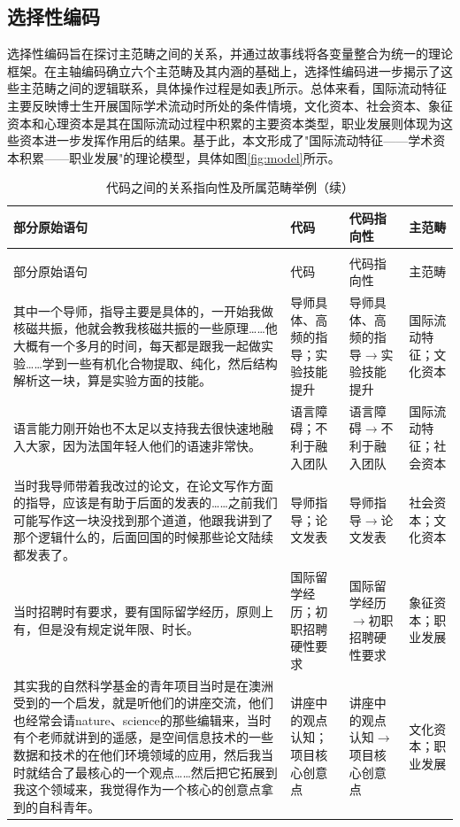 \subsection{选择性编码}

选择性编码旨在探讨主范畴之间的关系，并通过故事线将各变量整合为统一的理论框架。在主轴编码确立六个主范畴及其内涵的基础上，选择性编码进一步揭示了这些主范畴之间的逻辑联系，具体操作过程是如表\ref{tab:selective-coding}所示。总体来看，国际流动特征主要反映博士生开展国际学术流动时所处的条件情境，文化资本、社会资本、象征资本和心理资本是其在国际流动过程中积累的主要资本类型，职业发展则体现为这些资本进一步发挥作用后的结果。基于此，本文形成了"国际流动特征——学术资本积累——职业发展"的理论模型，具体如图\ref{fig:model}所示。

{\small
\begin{longtable}{p{5.5cm}p{3cm}p{3.5cm}p{2cm}}
\caption{代码之间的关系指向性及所属范畴举例} \label{tab:selective-coding} \\
\toprule
部分原始语句 & 代码 & 代码指向性 & 主范畴 \\
\midrule
\endfirsthead
\caption[]{代码之间的关系指向性及所属范畴举例（续）} \\
\toprule
部分原始语句 & 代码 & 代码指向性 & 主范畴 \\
\midrule
\endhead
\bottomrule
\endfoot
其中一个导师，指导主要是具体的，一开始我做核磁共振，他就会教我核磁共振的一些原理……他大概有一个多月的时间，每天都是跟我一起做实验……学到一些有机化合物提取、纯化，然后结构解析这一块，算是实验方面的技能。 & 导师具体、高频的指导；实验技能提升 & 导师具体、高频的指导$\to$实验技能提升 & 国际流动特征；文化资本 \\
语言能力刚开始也不太足以支持我去很快速地融入大家，因为法国年轻人他们的语速非常快。 & 语言障碍；不利于融入团队 & 语言障碍$\to$不利于融入团队 & 国际流动特征；社会资本 \\
当时我导师带着我改过的论文，在论文写作方面的指导，应该是有助于后面的发表的……之前我们可能写作这一块没找到那个道道，他跟我讲到了那个逻辑什么的，后面回国的时候那些论文陆续都发表了。 & 导师指导；论文发表 & 导师指导$\to$论文发表 & 社会资本；文化资本 \\
当时招聘时有要求，要有国际留学经历，原则上有，但是没有规定说年限、时长。 & 国际留学经历；初职招聘硬性要求 & 国际留学经历$\to$初职招聘硬性要求 & 象征资本；职业发展 \\
其实我的自然科学基金的青年项目当时是在澳洲受到的一个启发，就是听他们的讲座交流，他们也经常会请nature、science的那些编辑来，当时有个老师就讲到的遥感，是空间信息技术的一些数据和技术的在他们环境领域的应用，然后我当时就结合了最核心的一个观点……然后把它拓展到我这个领域来，我觉得作为一个核心的创意点拿到的自科青年。 & 讲座中的观点认知；项目核心创意点 & 讲座中的观点认知$\to$项目核心创意点 & 文化资本；职业发展 \\
\end{longtable}
}

